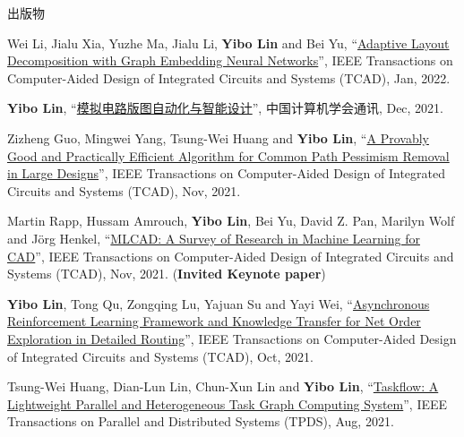 \begin{rSection}{出版物}
\begin{description}[font=\normalfont, rightmargin=2em]
{}
            

\item[{[J35]}]{
        Wei Li, Jialu Xia, Yuzhe Ma, Jialu Li, \textbf{Yibo Lin} and Bei Yu, 
    ``\href{https://doi.org/10.1109/TCAD.2022.3140729}{Adaptive Layout Decomposition with Graph Embedding Neural Networks}'', 
    IEEE Transactions on Computer-Aided Design of Integrated Circuits and Systems (TCAD), Jan, 2022.
    
}
            

\item[{[J34]}]{
        \textbf{Yibo Lin}, 
    ``\href{https://dl.ccf.org.cn/article/articleDetail.html?type=xhtx_thesis&_ack=1&id=5743150191429632}{模拟电路版图自动化与智能设计}'', 
    中国计算机学会通讯, Dec, 2021.
    
}
            

\item[{[J33]}]{
        Zizheng Guo, Mingwei Yang, Tsung-Wei Huang and \textbf{Yibo Lin}, 
    ``\href{https://doi.org/10.1109/TCAD.2021.3124758}{A Provably Good and Practically Efficient Algorithm for Common Path Pessimism Removal in Large Designs}'', 
    IEEE Transactions on Computer-Aided Design of Integrated Circuits and Systems (TCAD), Nov, 2021.
    
}
            

\item[{[J32]}]{
        Martin Rapp, Hussam Amrouch, \textbf{Yibo Lin}, Bei Yu, David Z. Pan, Marilyn Wolf and Jörg Henkel, 
    ``\href{https://doi.org/10.1109/TCAD.2021.3124762}{MLCAD: A Survey of Research in Machine Learning for CAD}'', 
    IEEE Transactions on Computer-Aided Design of Integrated Circuits and Systems (TCAD), Nov, 2021.
    (\textbf{Invited Keynote paper})
}
            

\item[{[J31]}]{
        \textbf{Yibo Lin}, Tong Qu, Zongqing Lu, Yajuan Su and Yayi Wei, 
    ``\href{https://doi.org/10.1109/TCAD.2021.3117505}{Asynchronous Reinforcement Learning Framework and Knowledge Transfer for Net Order Exploration in Detailed Routing}'', 
    IEEE Transactions on Computer-Aided Design of Integrated Circuits and Systems (TCAD), Oct, 2021.
    
}
            

\item[{[J30]}]{
        Tsung-Wei Huang, Dian-Lun Lin, Chun-Xun Lin and \textbf{Yibo Lin}, 
    ``\href{https://doi.org/10.1109/TPDS.2021.3104255}{Taskflow: A Lightweight Parallel and Heterogeneous Task Graph Computing System}'', 
    IEEE Transactions on Parallel and Distributed Systems (TPDS), Aug, 2021.
    
}
\end{description}
\end{rSection}
